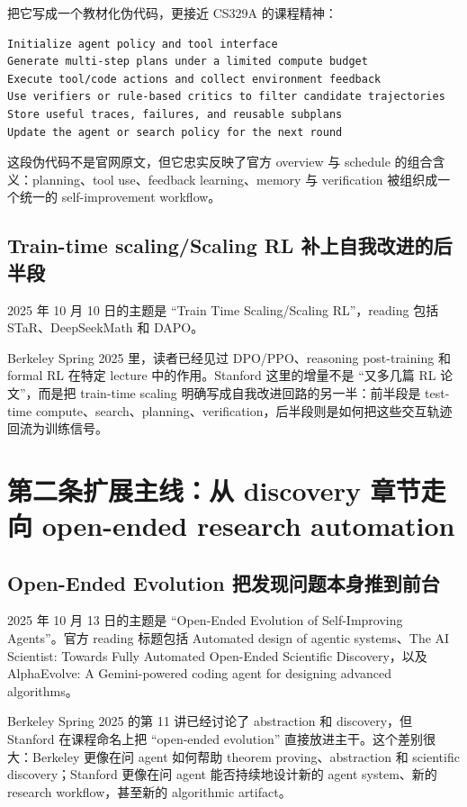 \documentclass[UTF8]{ctexbook}
\begin{document}
把它写成一个教材化伪代码，更接近 CS329A 的课程精神：
\begin{lstlisting}
Initialize agent policy and tool interface
Generate multi-step plans under a limited compute budget
Execute tool/code actions and collect environment feedback
Use verifiers or rule-based critics to filter candidate trajectories
Store useful traces, failures, and reusable subplans
Update the agent or search policy for the next round
\end{lstlisting}

这段伪代码不是官网原文，但它忠实反映了官方 overview 与 schedule 的组合含义：planning、tool use、feedback learning、memory 与 verification 被组织成一个统一的 self-improvement workflow。

\subsection{Train-time scaling/Scaling RL 补上自我改进的后半段}

2025 年 10 月 10 日的主题是 ``Train Time Scaling/Scaling RL''，reading 包括 STaR、DeepSeekMath 和 DAPO。

Berkeley Spring 2025 里，读者已经见过 DPO/PPO、reasoning post-training 和 formal RL 在特定 lecture 中的作用。Stanford 这里的增量不是 ``又多几篇 RL 论文''，而是把 train-time scaling 明确写成自我改进回路的另一半：前半段是 test-time compute、search、planning、verification，后半段则是如何把这些交互轨迹回流为训练信号。

\section{第二条扩展主线：从 discovery 章节走向 open-ended research automation}

\subsection{Open-Ended Evolution 把发现问题本身推到前台}

2025 年 10 月 13 日的主题是 ``Open-Ended Evolution of Self-Improving Agents''。官方 reading 标题包括 Automated design of agentic systems、The AI Scientist: Towards Fully Automated Open-Ended Scientific Discovery，以及 AlphaEvolve: A Gemini-powered coding agent for designing advanced algorithms。

Berkeley Spring 2025 的第 11 讲已经讨论了 abstraction 和 discovery，但 Stanford 在课程命名上把 ``open-ended evolution'' 直接放进主干。这个差别很大：Berkeley 更像在问 agent 如何帮助 theorem proving、abstraction 和 scientific discovery；Stanford 更像在问 agent 能否持续地设计新的 agent system、新的 research workflow，甚至新的 algorithmic artifact。
\end{document}

